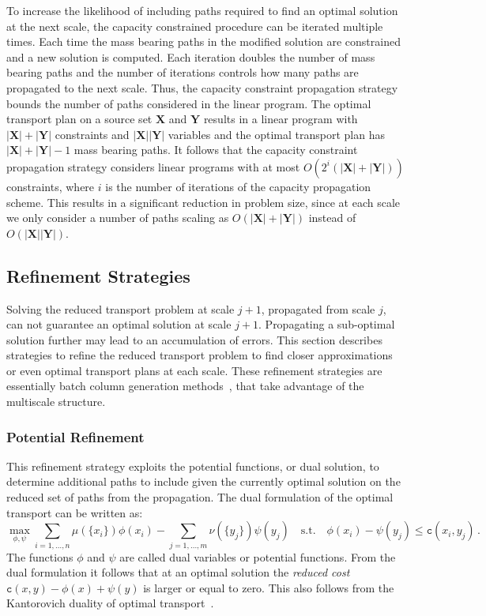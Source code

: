 \documentclass[twoside,11pt]{article}
\newcommand{\cost}[0]{\mathtt{c}}
\newcommand{\Xsp}{{\mathbf{X}}}
\newcommand{\Ysp}{{\mathbf{Y}}}
\begin{document}
To increase the likelihood of including paths required to find an optimal
solution at the next scale, the capacity constrained procedure can be iterated
multiple times.  Each time the mass bearing paths in the modified solution are
constrained and a new solution is computed. Each iteration doubles the number
of mass bearing paths and the number of iterations controls how many paths are
propagated to the next scale. Thus, the capacity constraint propagation
strategy bounds the number of paths considered in the linear program. The
optimal transport plan on a source set $\Xsp$ and $\Ysp$ results in a linear
program with $|\Xsp| + |\Ysp|$ constraints and $|\Xsp| |\Ysp|$ variables and
the optimal transport plan has $|\Xsp| + |\Ysp| - 1$  mass bearing paths. It
follows that the capacity constraint propagation strategy considers linear
programs with at most $O\left( 2^i (|\Xsp| + |\Ysp|) \right)$ constraints,
where $i$ is the number of iterations of the capacity propagation scheme. This
results in a significant reduction in problem size, since at each scale we only
consider a number of paths scaling as $O(|\Xsp|+|\Ysp|)$ instead of $O(|\Xsp|
|\Ysp|)$.



\subsection{Refinement Strategies}
\label{sec:refinement}
Solving the reduced transport problem at scale $j+1$, propagated from scale
$j$, can not guarantee an optimal solution at scale $j+1$. Propagating a
sub-optimal solution further may lead to an accumulation of errors. This
section describes strategies to refine the reduced transport problem to find
closer approximations or even optimal transport plans at each scale.  These
refinement strategies are essentially batch column generation
methods~\citep{desaulniers:book2002}, that take advantage of the multiscale
structure.





\subsubsection{Potential Refinement}
\label{sec:potential}
This refinement strategy exploits the potential functions, or dual solution, to
determine additional paths to include given the currently optimal solution on
the reduced set of paths from the propagation. The dual formulation of the
optimal transport can be written as:
\begin{equation}
  \max_{\phi, \psi} 
  \sum_{i=1,\dots,n} \mu(\{x_i\}) \phi(x_i) - 
  \sum_{j=1,\dots,m} \nu(\{y_j\}) \psi(y_j)
  \quad \text{s.t.} \quad 
  \phi(x_i) - \psi(y_j) \leq \cost(x_i, y_j) \,.
\label{e:DualLPformulation}
\end{equation}
The functions $\phi$ and $\psi$ are called dual variables or potential
functions.  From the dual formulation it follows that at an optimal solution
the {\em reduced cost} $\cost(x, y) - \phi(x) + \psi(y)$ is larger or equal to
zero. This also follows from the Kantorovich duality of optimal
transport~\citep[Chapter~5]{villani:book2009}.
\end{document}
